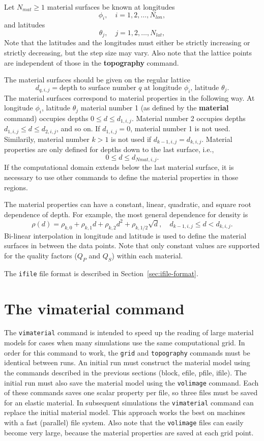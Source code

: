 \documentclass[11pt]{report}
\begin{document}
Let $N_{mat}\geq 1$ material surfaces be known at longitudes
\[
\phi_i,\quad i=1,2,\ldots,N_{lon},
\]
and latitudes
\[
\theta_j,\quad j=1,2,\ldots,N_{lat},
\]
Note that the latitudes and the longitudes must either be strictly increasing or strictly
decreasing, but the step size may vary. Also note that the lattice points are independent of those
in the {\bf topography} command.

The material surfaces should be given on the regular lattice
\[
d_{q,i,j} = \mbox{depth to surface number $q$ at longitude $\phi_i$, latitude $\theta_j$.}
\]
The material surfaces correspond to material properties in the following way. At longitude $\phi_i$,
latitude $\theta_j$ material number 1 (as defined by the {\bf material} command) occupies depths
$0\leq d \leq d_{1,i,j}$. Material number 2 occupies depths $d_{1,i,j} \leq d \leq d_{2,i,j}$, and
so on. If $d_{1,i,j}=0$, material number 1 is not used. Similarily, material number $k>1$ is not
used if $d_{k-1,i,j} = d_{k,i,j}$. Material properties are only defined for depths down to the last
surface, i.e.,
\[
0\leq d \leq d_{Nmat,i,j}.
\]
If the computational domain extends below the last material surface, it is necessary to use other
commands to define the material properties in those regions.

The material properties can have a constant, linear, quadratic, and square root dependence of
depth. For example, the most general dependence for density is
\[
\rho(d) = \rho_{k,0} + \rho_{k,1} d + \rho_{k,2} d^2 + \rho_{k,1/2} \sqrt{d},\quad d_{k-1,i,j} \leq d < d_{k,i,j}.
\]
Bi-linear interpolation in longitude and latitude is used to define the material surfaces in between
the data points. Note that only constant values are supported for the quality factors
($Q_P$ and $Q_S$) within each material. 

The \verb+ifile+ file format is described in Section~\ref{sec:ifile-format}.

\section{The vimaterial command}\label{sec:vimat}

The \verb+vimaterial+ command is intended to speed up the reading of large material models for cases
when many simulations use the same computational grid. In order for this command to work, the
\verb+grid+ and \verb+topography+ commands must be identical between runs. An initial run must
construct the material model using the commands described in the previous sections (block, efile,
pfile, ifile). The initial run must also save the material model using the \verb+volimage+
command. Each of these commands saves one scalar property per file, so three files must be saved for
an elastic material. In subsequent simulations the \verb+vimaterial+ command can replace the initial
material model. This approach works the best on machines with a fast (parallel) file system. Also
note that the \verb+volimage+ files can easily become very large, because the material properties
are saved at each grid point.
\end{document}
